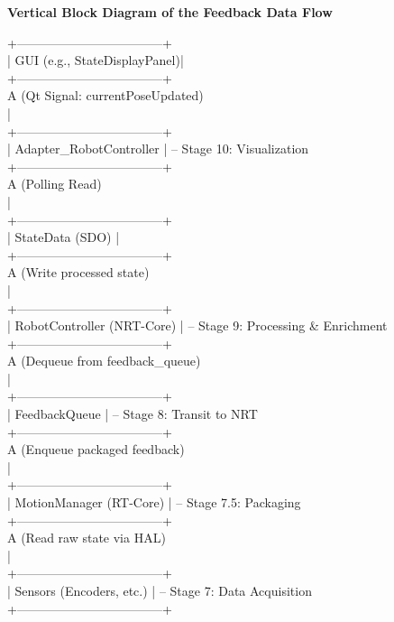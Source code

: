 \begin{figure}[h!]
    \centering
    \begin{tcolorbox}[width=\textwidth, title=The Feedback Pipeline]
        \textbf{Vertical Block Diagram of the Feedback Data Flow}
        \vspace{0.5cm}
        
        +-----------------------------------+ \\
        |      GUI (e.g., StateDisplayPanel)| \\
        +-----------------------------------+ \\
        A (Qt Signal: currentPoseUpdated) \\
        | \\
        +-----------------------------------+ \\
        |      Adapter\_RobotController     | -- Stage 10: Visualization \\
        +-----------------------------------+ \\
        A (Polling Read) \\
        | \\
        +-----------------------------------+ \\
        |      StateData (SDO)              | \\
        +-----------------------------------+ \\
        A (Write processed state) \\
        | \\
        +-----------------------------------+ \\
        |      RobotController (NRT-Core)   | -- Stage 9: Processing \& Enrichment \\
        +-----------------------------------+ \\
        A (Dequeue from feedback\_queue) \\
        | \\
        +-----------------------------------+ \\
        |      FeedbackQueue                | -- Stage 8: Transit to NRT \\
        +-----------------------------------+ \\
        A (Enqueue packaged feedback) \\
        | \\
        +-----------------------------------+ \\
        |      MotionManager (RT-Core)      | -- Stage 7.5: Packaging \\
        +-----------------------------------+ \\
        A (Read raw state via HAL) \\
        | \\
        +-----------------------------------+ \\
        |      Sensors (Encoders, etc.)     | -- Stage 7: Data Acquisition \\
        +-----------------------------------+


\end{tcolorbox}
\end{figure}
